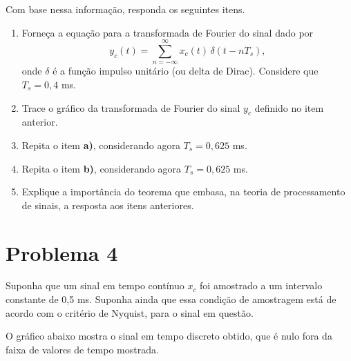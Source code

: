 \documentclass[12pt,a4paper]{article}
\begin{document}
\begin{center}
\end{center}

Com base nessa informação, responda os seguintes itens.

\begin{enumerate}
  \item Forneça a equação para a transformada de Fourier do sinal dado por
        \[
          y_c(t) = \sum_{n=-\infty}^{\infty} x_c(t)\,\delta(t - nT_s),
        \]
        onde $\delta$ é a função impulso unitário (ou delta de Dirac). Considere que
        $T_s = 0{,}4$ ms.

  \item Trace o gráfico da transformada de Fourier do sinal $y_c$ definido no item anterior.

  \item Repita o item \textbf{a)}, considerando agora $T_s = 0{,}625$ ms.

  \item Repita o item \textbf{b)}, considerando agora $T_s = 0{,}625$ ms.

  \item Explique a importância do teorema que embasa, na teoria de processamento de sinais, a
        resposta aos itens anteriores.
\end{enumerate}

\section{Problema 4}
Suponha que um sinal em tempo contínuo $x_c$ foi amostrado a um intervalo constante de 0,5 ms.
Suponha ainda que essa condição de amostragem está de acordo com o critério de Nyquist, para o
sinal em questão.

O gráfico abaixo mostra o sinal em tempo discreto obtido, que é nulo fora da faixa de valores de
tempo mostrada.
\end{document}

